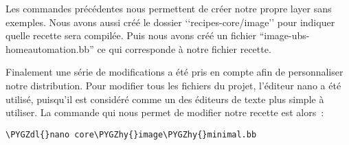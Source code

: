 \documentclass[letterpaper,10pt,french]{sphinxmanual}
\def\PYGZdl{\char`\$}
\def\PYGZhy{\char`\-}
\begin{document}
Les commandes précédentes nous permettent de créer notre propre layer sans exemples. Nous avons aussi créé le dossier ‘‘recipes-core/image’’ pour indiquer quelle recette sera compilée. Puis nous avons créé un fichier ``image-ubs-homeautomation.bb'' ce qui corresponde à notre fichier recette.

Finalement une série de modifications a été pris en compte afin de personnaliser notre distribution. Pour modifier tous les fichiers du projet, l’éditeur nano a été utilisé, puisqu’il est considéré comme un des éditeurs de texte plus simple à utiliser. La commande qui nous permet de modifier notre recette est alors :

\begin{Verbatim}[commandchars=\\\{\}]
\PYGZdl{}nano core\PYGZhy{}image\PYGZhy{}minimal.bb
\end{Verbatim}
\end{document}
